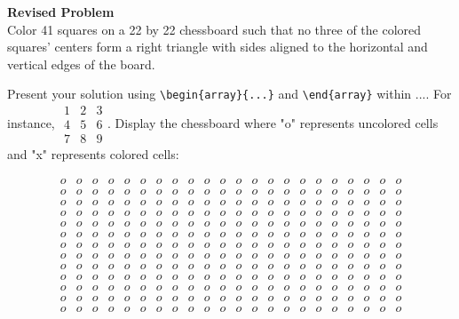 \textbf{Revised Problem}\\
Color 41 squares on a 22 by 22 chessboard such that no three of the colored squares' centers form a right triangle with sides aligned to the horizontal and vertical edges of the board.

Present your solution using \verb|\begin{array}{...}| and \verb|\end{array}| within $\boxed{...}$. For instance, $\boxed{\begin{array}{ccc}1 & 2 & 3 \\ 4 & 5 & 6 \\ 7 & 8 & 9\end{array}}$.
Display the chessboard where "o" represents uncolored cells and "x" represents colored cells:

$$\begin{array}{cccccccccccccccccccccc}
o & o & o & o & o & o & o & o & o & o & o & o & o & o & o & o & o & o & o & o & o & o \\
o & o & o & o & o & o & o & o & o & o & o & o & o & o & o & o & o & o & o & o & o & o \\
o & o & o & o & o & o & o & o & o & o & o & o & o & o & o & o & o & o & o & o & o & o \\
o & o & o & o & o & o & o & o & o & o & o & o & o & o & o & o & o & o & o & o & o & o \\
o & o & o & o & o & o & o & o & o & o & o & o & o & o & o & o & o & o & o & o & o & o \\
o & o & o & o & o & o & o & o & o & o & o & o & o & o & o & o & o & o & o & o & o & o \\
o & o & o & o & o & o & o & o & o & o & o & o & o & o & o & o & o & o & o & o & o & o \\
o & o & o & o & o & o & o & o & o & o & o & o & o & o & o & o & o & o & o & o & o & o \\
o & o & o & o & o & o & o & o & o & o & o & o & o & o & o & o & o & o & o & o & o & o \\
o & o & o & o & o & o & o & o & o & o & o & o & o & o & o & o & o & o & o & o & o & o \\
o & o & o & o & o & o & o & o & o & o & o & o & o & o & o & o & o & o & o & o & o & o \\
o & o & o & o & o & o & o & o & o & o & o & o & o & o & o & o & o & o & o & o & o & o \\
o & o & o & o & o & o & o & o & o & o & o & o & o & o & o & o & o & o & o & o & o & o \\

\end{array}$$
